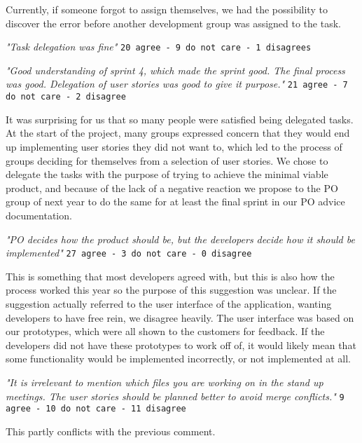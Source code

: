 Currently, if someone forgot to assign themselves, we had the possibility to discover the error before another development group was assigned to the task.
\begin{center}
\textit{"Task delegation was fine"}
\newline
\texttt{20 agree - 9 do not care - 1 disagrees}
\end{center}
\begin{center}
\textit{"Good understanding of sprint 4, which made the sprint good. The final process was good. Delegation of user stories was good to give it purpose."}
\newline
\texttt{21 agree - 7 do not care - 2 disagree}  
\end{center}
It was surprising for us that so many people were satisfied being delegated tasks. 
At the start of the project, many groups expressed concern that they would end up implementing user stories they did not want to, which led to the process of groups deciding for themselves from a selection of user stories.
We chose to delegate the tasks with the purpose of trying to achieve the minimal viable product, and because of the lack of a negative reaction we propose to the PO group of next year to do the same for at least the final sprint in our PO advice documentation.
\begin{center}
\textit{"PO decides how the product should be, but the developers decide how it should be implemented"}
\newline
\texttt{27 agree - 3 do not care - 0 disagree}
\end{center}
This is something that most developers agreed with, but this is also how the process worked this year so the purpose of this suggestion was unclear.
If the suggestion actually referred to the user interface of the application, wanting developers to have free rein, we disagree heavily.
The user interface was based on our prototypes, which were all shown to the customers for feedback. 
If the developers did not have these prototypes to work off of, it would likely mean that some functionality would be implemented incorrectly, or not implemented at all.
\begin{center}
\textit{"It is irrelevant to mention which files you are working on in the stand up meetings. The user stories should be planned better to avoid merge conflicts."}
\newline
\texttt{9 agree - 10 do not care - 11 disagree}
\end{center}
This partly conflicts with the previous comment. 
